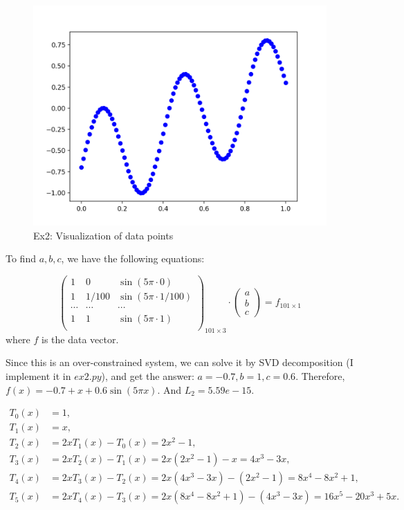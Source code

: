 \documentclass[
  course = {{16-811 Math Fundamentals for Robotics}},
  quartile = {{1}},
  assignment = 3,
  name = {{Kangle Deng}},
  email = {{kangled@andrew.cmu.edu}},
  firstexercise = 1
]{aga-homework}
\begin{document}
\begin{figure}
    \centering
    \includegraphics{math/fig/hw3/ex2.png}
    \caption{Ex2: Visualization of data points}
    \label{fig:hw3_ex2}
\end{figure}

To find $a,b,c$, we have the following equations:

\begin{equation*}
    \left(
    \begin{array}{ccc}
        1 & 0 & \sin(5\pi \cdot 0) \\
        1 & 1/100 & \sin(5\pi \cdot 1/100) \\
        \cdots & \cdots & \cdots \\
        1 & 1 & \sin(5\pi \cdot 1) \\
    \end{array}
    \right)_{101 \times 3} \cdot
    \left(
    \begin{array}{c}
        a \\ b \\ c
    \end{array}
    \right)
     = f_{101 \times 1}
\end{equation*}
where $f$ is the data vector.

Since this is an over-constrained system, we can solve it by SVD decomposition (I implement it in $ex2.py$), and get the answer: $a = -0.7, b = 1, c=0.6$. Therefore, $f(x) = -0.7 + x + 0.6\sin(5\pi x)$. And $L_2 = 5.59e-15$.

\exercise
\subexercise
\begin{equation*}
    \begin{aligned}
        T_0(x) &= 1, \\
        T_1(x) &= x, \\
        T_2(x) &= 2xT_1(x) - T_0(x) = 2x^2 - 1, \\
        T_3(x) &= 2xT_2(x) - T_1(x) = 2x(2x^2-1) - x = 4x^3 - 3x,\\
        T_4(x) &= 2xT_3(x) - T_2(x) = 2x(4x^3 - 3x) - (2x^2 - 1) = 8x^4 - 8x^2 + 1, \\
        T_5(x) &= 2xT_4(x) - T_3(x) = 2x(8x^4 - 8x^2 + 1) - (4x^3 - 3x) = 16x^5 - 20x^3 + 5x.
    \end{aligned}
\end{equation*}
\end{document}
